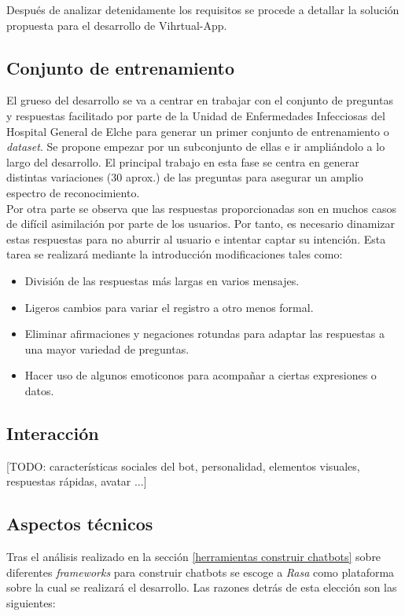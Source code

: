 Después de analizar detenidamente los requisitos se procede a detallar la solución propuesta para el desarrollo de Vihrtual-App.

\subsection{Conjunto de entrenamiento}
El grueso del desarrollo se va a centrar en trabajar con el conjunto de preguntas y respuestas facilitado por parte de la Unidad de Enfermedades Infecciosas del Hospital General de Elche para generar un primer conjunto de entrenamiento o \textit{dataset}. Se propone empezar por un subconjunto de ellas e ir ampliándolo a lo largo del desarrollo. El principal trabajo en esta fase se centra en generar distintas variaciones (30 aprox.) de las preguntas para asegurar un amplio espectro de reconocimiento.\\

Por otra parte se observa que las respuestas proporcionadas son en muchos casos de difícil asimilación por parte de los usuarios. Por tanto, es necesario dinamizar estas respuestas para no aburrir al usuario e intentar captar su intención. Esta tarea se realizará mediante la introducción modificaciones tales como:

\begin{itemize}
	\item División de las respuestas más largas en varios mensajes.
	\item Ligeros cambios para variar el registro a otro menos formal.
	\item Eliminar afirmaciones y negaciones rotundas para adaptar las respuestas a una mayor variedad de preguntas.
	\item Hacer uso de algunos emoticonos para acompañar a ciertas expresiones o datos.
\end{itemize}

\subsection{Interacción}
[TODO: características sociales del bot, personalidad, elementos visuales, respuestas rápidas, avatar ...]


\subsection{Aspectos técnicos}
Tras el análisis realizado en la sección \ref{herramientas construir chatbots} sobre diferentes \textit{frameworks} para construir chatbots se escoge a \textit{Rasa} como plataforma sobre la cual se realizará el desarrollo. Las razones detrás de esta elección son las siguientes:\\ 

